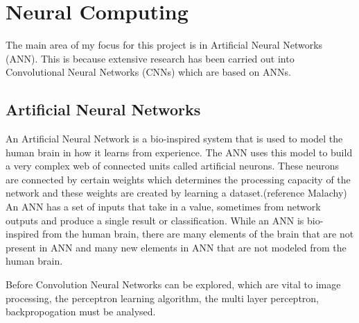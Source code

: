 \section{Neural Computing}
The main area of my focus for this project is in
Artificial Neural Networks (ANN). This is because extensive research has been carried out into Convolutional Neural Networks (CNNs) which are based on ANNs.
\subsection*{Artificial Neural Networks}
An Artificial Neural Network is a bio-inspired system that is used to model the human brain in how it learns from experience.
The ANN uses this model to build a very complex web of connected units called
artificial neurons.
These neurons are connected by certain weights which determines the processing
capacity of the network and these weights are created by learning a
dataset.(reference Malachy)
An ANN has a set of inputs that take in a value, sometimes from network outputs
and produce a single result or classification.
While an ANN is bio-inspired from the human brain, there are many elements of
the brain that are not present in ANN and many new elements in ANN that are not
modeled from the human brain.

Before Convolution Neural Networks can be explored, which are vital to image
processing, the perceptron learning algorithm, the multi
layer perceptron, backpropogation must be analysed.



